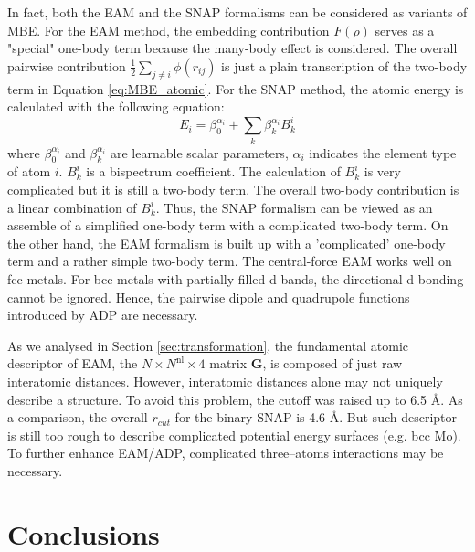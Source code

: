 \documentclass[prb,reprint,superscriptaddress]{revtex4-2}
\begin{document}
In fact, both the EAM and the SNAP formalisms can be considered as variants of 
MBE. For the EAM method, the embedding contribution $F(\rho)$ 
serves as a "special" one-body term because the many-body effect is considered.
The overall pairwise contribution $\frac{1}{2}\sum_{j\ne i}{\phi(r_{ij})}$ is 
just a plain transcription of the two-body term in Equation \ref{eq:MBE_atomic}. 
For the SNAP method, the atomic energy is calculated with the following 
equation: 
\begin{equation}
\label{eq:snap_formalism}
E_i = \beta_{0}^{\alpha_{i}} + \sum_{k}{\beta_{k}^{\alpha_{i}}B_{k}^i}
\end{equation} 
where $\beta_{0}^{\alpha_i}$ and $\beta_{k}^{\alpha_i}$ are learnable scalar
parameters, $\alpha_i$ indicates the element type of atom $i$. $B_{k}^{i}$ is a 
bispectrum coefficient. The calculation of $B_{k}^{i}$ is very complicated 
\cite{SNAP_Algo} but it is still a two-body term. The overall two-body 
contribution is a linear combination of $B_{k}^{i}$. Thus, the SNAP formalism 
can be viewed as an assemble of a simplified one-body term with a complicated 
two-body term. 
On the other hand, the EAM formalism is built up with a 'complicated' one-body 
term and a rather simple two-body term. The central-force EAM works well on fcc 
metals. For bcc metals with partially filled d bands, the directional d bonding 
cannot be ignored. Hence, the pairwise dipole and quadrupole functions 
introduced by ADP are necessary.

As we analysed in Section \ref{sec:transformation}, the fundamental atomic 
descriptor of EAM, the $N \times N^{\mathrm{nl}} \times 4$ matrix $\mathbf{G}$, 
is composed of just raw interatomic distances. However, interatomic distances
alone may not uniquely describe a structure. To avoid this problem, the cutoff 
was raised up to 6.5 \AA. As a comparison, the overall $r_{cut}$ for the binary 
SNAP is 4.6 \AA. But such descriptor is still too rough to describe complicated 
potential energy surfaces (e.g. bcc Mo). To further enhance EAM/ADP, complicated
three--atoms interactions may be necessary.

% 
%
\section{Conclusions}
\label{sec:conclusions}
\end{document}
